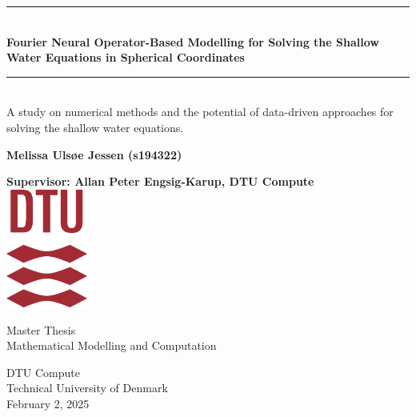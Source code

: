 \begin{titlepage}
\newcommand{\HRule}{\rule{\linewidth}{0.5mm}} 


    \begin{center}
        
        \HRule\\[0.4cm]
        
        {\huge\bfseries Fourier Neural Operator-Based Modelling for Solving the Shallow Water Equations in Spherical Coordinates}\\[0.4cm]
        

        \HRule\\[1.5cm]
 
        A study on numerical methods and the potential of data-driven approaches for solving the shallow water equations.

        \vspace{1.1cm}
 
        \textbf{Melissa Ulsøe Jessen (s194322)}
        
        \vspace{1.1cm}
 
        \textbf{Supervisor: Allan Peter Engsig-Karup,  DTU Compute}\\

             
        \vspace{1.5cm}
        \includegraphics[width=0.2\textwidth]{figs/DTU.png}
             
         \vspace{1cm}
             
         Master Thesis\\
         Mathematical Modelling and Computation\\   
         
         \vfill
             
        DTU Compute\\
        Technical University of Denmark\\
        February 2, 2025
             
    \end{center}
 \end{titlepage}

